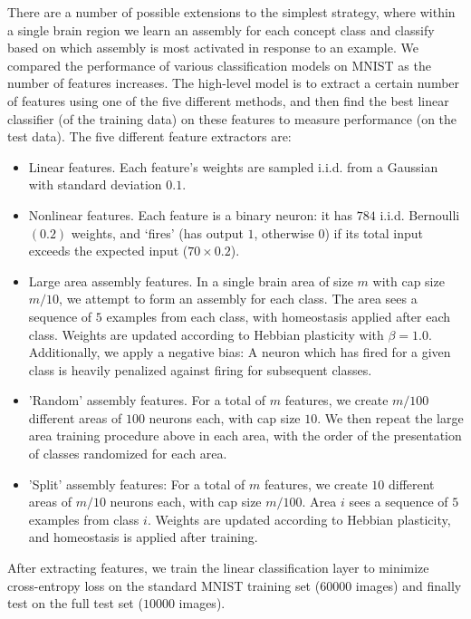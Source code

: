 \documentclass[final,12pt]{colt2022} %
\begin{document}
There are a number of possible extensions to the simplest strategy, where within a single brain region we learn an assembly for each concept class and classify based on which assembly is most activated in response to an example. 
We compared the performance of various classification models on MNIST as the number of features increases. The high-level model is to extract a certain number of features using one of the five different methods, and then find the best linear classifier (of the training data) on these features to measure performance (on the test data). The five different feature extractors are:
\begin{itemize}
    \item Linear features. Each feature's weights are sampled i.i.d. from a Gaussian with standard deviation $0.1$.
    \item Nonlinear features. Each feature is a binary neuron: it has $784$ i.i.d. Bernoulli$(0.2)$ weights, and `fires' (has output $1$, otherwise $0$) if its total input exceeds the expected input ($70 \times 0.2$).
    \item Large area assembly features. In a single brain area of size $m$ with cap size $m / 10$, we attempt to form an assembly for each class. The area sees a sequence of $5$ examples from each class, with homeostasis applied after each class. Weights are updated according to Hebbian plasticity with $\beta = 1.0$. Additionally, we apply a negative bias: A neuron which has fired for a given class is heavily penalized against firing for subsequent classes.
    \item 'Random' assembly features. For a total of $m$ features, we create $m / 100$ different areas of $100$ neurons each, with cap size $10$. We then repeat the large area training procedure above in each area, with the order of the presentation of classes randomized for each area.
    \item 'Split' assembly features: For a total of $m$ features, we create $10$ different areas of $m / 10$ neurons each, with cap size $m / 100$. Area $i$ sees a sequence of $5$ examples from class $i$. Weights are updated according to Hebbian plasticity, and homeostasis is applied after training.
\end{itemize}
After extracting features, we train the linear classification layer to minimize cross-entropy loss on the standard MNIST training set ($60000$ images) and finally test on the full test set ($10000$ images). 
\end{document}
